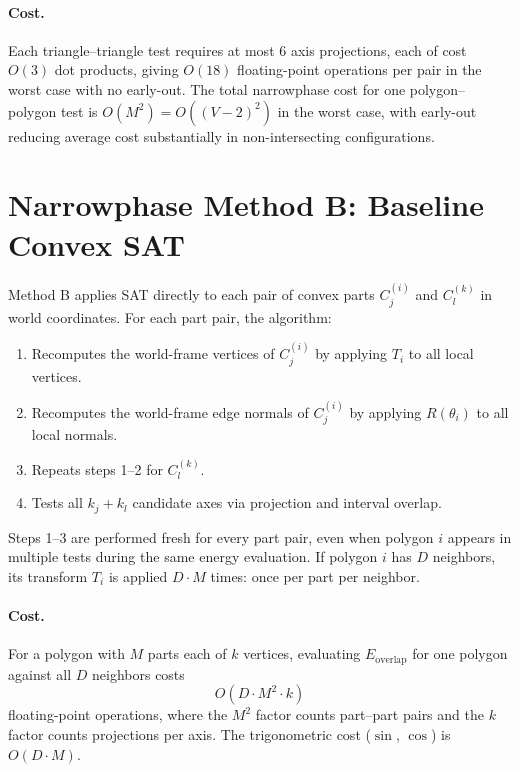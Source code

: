 \paragraph{Cost.}
Each triangle--triangle test requires at most $6$ axis projections,
each of cost $O(3)$ dot products, giving $O(18)$ floating-point
operations per pair in the worst case with no early-out.
The total narrowphase cost for one polygon--polygon test is
$O(M^2) = O((V-2)^2)$ in the worst case, with early-out reducing
average cost substantially in non-intersecting configurations.

\section{Narrowphase Method B: Baseline Convex SAT}
\label{sec:method-b}

Method B applies SAT directly to each pair of convex parts
$C_j^{(i)}$ and $C_l^{(k)}$ in world coordinates.
For each part pair, the algorithm:
\begin{enumerate}
  \item Recomputes the world-frame vertices of $C_j^{(i)}$ by applying
        $T_i$ to all local vertices.
  \item Recomputes the world-frame edge normals of $C_j^{(i)}$ by
        applying $R(\theta_i)$ to all local normals.
  \item Repeats steps 1--2 for $C_l^{(k)}$.
  \item Tests all $k_j + k_l$ candidate axes via projection and
        interval overlap.
\end{enumerate}
Steps 1--3 are performed fresh for every part pair, even when polygon
$i$ appears in multiple tests during the same energy evaluation.
If polygon $i$ has $D$ neighbors, its transform $T_i$ is applied
$D \cdot M$ times: once per part per neighbor.

\paragraph{Cost.}
For a polygon with $M$ parts each of $k$ vertices, evaluating
$E_{\mathrm{overlap}}$ for one polygon against all $D$ neighbors costs
\[
  O(D \cdot M^2 \cdot k)
\]
floating-point operations, where the $M^2$ factor counts part--part
pairs and the $k$ factor counts projections per axis.
The trigonometric cost ($\sin$, $\cos$) is $O(D \cdot M)$.

